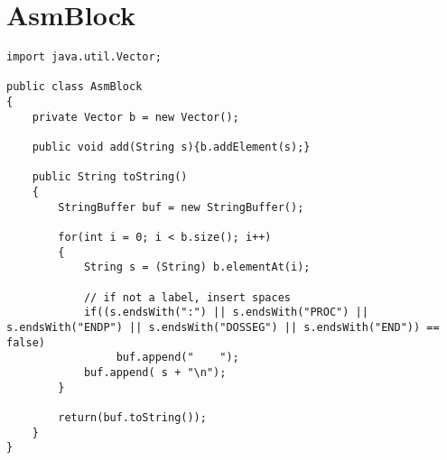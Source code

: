 \chapter{AsmBlock}
\label{a:asmblock}
\OverviewLineNoTitle
\begin{footnotesize}\begin{verbatim}
import java.util.Vector;

public class AsmBlock
{
    private Vector b = new Vector();
    
    public void add(String s){b.addElement(s);}

    public String toString()
    {
        StringBuffer buf = new StringBuffer();

        for(int i = 0; i < b.size(); i++)
        {
            String s = (String) b.elementAt(i);

            // if not a label, insert spaces
            if((s.endsWith(":") || s.endsWith("PROC") || s.endsWith("ENDP") || s.endsWith("DOSSEG") || s.endsWith("END")) == false)
                 buf.append("    ");
            buf.append( s + "\n");
        }
        
        return(buf.toString());         
    }
}
\end{verbatim}\end{footnotesize}
